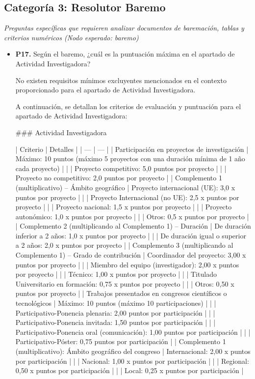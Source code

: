 \documentclass{article}
\begin{document}
\subsection{Categoría 3: Resolutor Baremo}
\textit{Preguntas específicas que requieren analizar documentos de baremación, tablas y criterios numéricos (Nodo esperado: baremo)}
\begin{itemize}
  \item \textbf{P17.} Según el baremo, ¿cuál es la puntuación máxima en el apartado de Actividad Investigadora? \\
    \begin{respuesta_agente}
      No existen requisitos mínimos excluyentes mencionados en el contexto proporcionado para el apartado de Actividad Investigadora.

A continuación, se detallan los criterios de evaluación y puntuación para el apartado de Actividad Investigadora:

\#\#\# Actividad Investigadora

| Criterio | Detalles |
| --- | --- |
| Participación en proyectos de investigación | Máximo: 10 puntos (máximo 5 proyectos con una duración mínima de 1 año cada proyecto) |
|  | Proyecto competitivo: 5,0 puntos por proyecto |
|  | Proyecto no competitivo: 2,0 puntos por proyecto |
| Complemento 1 (multiplicativo) – Ámbito geográfico | Proyecto internacional (UE): 3,0 x puntos por proyecto |
|  | Proyecto Internacional (no UE): 2,5 x puntos por proyecto |
|  | Proyecto nacional: 1,5 x puntos por proyecto |
|  | Proyecto autonómico: 1,0 x puntos por proyecto |
|  | Otros: 0,5 x puntos por proyecto |
| Complemento 2 (multiplicando al Complemento 1) – Duración | De duración inferior a 2 años: 1,0 x puntos por proyecto |
|  | De duración igual o superior a 2 años: 2,0 x puntos por proyecto |
| Complemento 3 (multiplicando al Complemento 1) – Grado de contribución | Coordinador del proyecto: 3,00 x puntos por proyecto |
|  | Miembro del equipo (investigador): 2,00 x puntos por proyecto |
|  | Técnico: 1,00 x puntos por proyecto |
|  | Titulado Universitario en formación: 0,75 x puntos por proyecto |
|  | Otros: 0,50 x puntos por proyecto |
| Trabajos presentados en congresos científicos o tecnológicos | Máximo: 10 puntos (máximo 10 participaciones) |
|  | Participativo-Ponencia plenaria: 2,00 puntos por participación |
|  | Participativo-Ponencia invitada: 1,50 puntos por participación |
|  | Participativo-Ponencia oral (comunicación): 1,00 puntos por participación |
|  | Participativo-Póster: 0,75 puntos por participación |
| Complemento 1 (multiplicativo): Ámbito geográfico del congreso | Internacional: 2,00 x puntos por participación |
|  | Nacional: 1,00 x puntos por participación |
|  | Regional: 0,50 x puntos por participación |
|  | Local: 0,25 x puntos por participación |


\end{respuesta_agente}
\end{itemize}
\end{document}
